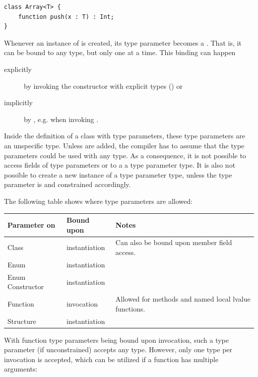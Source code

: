 \documentclass{haxe}
\begin{document}
\begin{lstlisting}
class Array<T> {
	function push(x : T) : Int;
}
\end{lstlisting}
Whenever an instance of  is created, its type parameter  becomes a . That is, it can be bound to any type, but only one at a time. This binding can happen

\begin{description}
	\item[explicitly] by invoking the constructor with explicit types () or
	\item[implicitly] by , e.g. when invoking .
\end{description}
Inside the definition of a class with type parameters, these type parameters are an unspecific type. Unless  are added, the compiler has to assume that the type parameters could be used with any type. As a consequence, it is not possible to access fields of type parameters or  to a a type parameter type. It is also not possible to create a new instance of a type parameter type, unless the type parameter is  and constrained accordingly. 

The following table shows where type parameters are allowed:

\begin{center}
\begin{tabular}{| l | l | l |}
	\hline
	Parameter on & Bound upon & Notes \\ \hline
	Class & instantiation & Can also be bound upon member field access. \\
	Enum & instantiation & \\
	Enum Constructor & instantiation & \\
	Function & invocation & Allowed for methods and named local lvalue functions. \\
	Structure & instantiation & \\ \hline
\end{tabular}
\end{center}
With function type parameters being bound upon invocation, such a type parameter (if unconstrained) accepts any type. However, only one type per invocation is accepted, which can be utilized if a function has multiple arguments:
\end{document}
